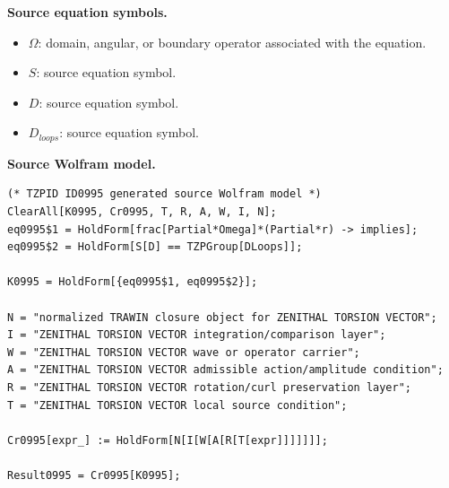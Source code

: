 \begin{minipage}[t]{0.49\linewidth}
\begingroup
\small
\raggedright
\textbf{Source equation symbols.}\par
\begin{itemize}[leftmargin=1.35em,itemsep=1pt,topsep=1pt,parsep=0pt]
    \item $\Omega$: domain, angular, or boundary operator associated with the equation.
    \item $S$: source equation symbol.
    \item $D$: source equation symbol.
    \item $D_{loops}$: source equation symbol.
\end{itemize}
\endgroup
\end{minipage}\hfill
\begin{minipage}[t]{0.47\linewidth}
\begingroup
\scriptsize
\raggedright
\textbf{Source Wolfram model.}\par
\begin{Verbatim}[fontsize=\tiny,breaklines=true,breakanywhere=true]
(* TZPID ID0995 generated source Wolfram model *)
ClearAll[K0995, Cr0995, T, R, A, W, I, N];
eq0995$1 = HoldForm[frac[Partial*Omega]*(Partial*r) -> implies];
eq0995$2 = HoldForm[S[D] == TZPGroup[DLoops]];

K0995 = HoldForm[{eq0995$1, eq0995$2}];

N = "normalized TRAWIN closure object for ZENITHAL TORSION VECTOR";
I = "ZENITHAL TORSION VECTOR integration/comparison layer";
W = "ZENITHAL TORSION VECTOR wave or operator carrier";
A = "ZENITHAL TORSION VECTOR admissible action/amplitude condition";
R = "ZENITHAL TORSION VECTOR rotation/curl preservation layer";
T = "ZENITHAL TORSION VECTOR local source condition";

Cr0995[expr_] := HoldForm[N[I[W[A[R[T[expr]]]]]]];

Result0995 = Cr0995[K0995];
\end{Verbatim}
\endgroup
\end{minipage}


